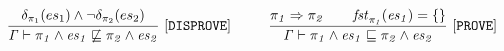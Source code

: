  \begin{gather*}
\frac{
\begin{matrix}
\text{\codeme{\delta_{\pi_1}(\es_1) \wedge \neg \delta_{\pi_2}(\es_2) }}
\end{matrix}
}{\text{\code{\Gamma  \vdash  \pi_1 \wedge \es_1 \not\CONTAIN  \pi_2 \wedge \es_2 }}}\ \codeme{  [DISPROVE]} 
\qquad\ \ 
\frac{
\begin{matrix}
\text{\code{\pi_1 \Rightarrow \pi_2 \quad\ \  
\m{fst}_{\pi_1}(\es_1) = \{\}
}}
\end{matrix}
}{\text{\code{\Gamma   \vdash  \pi_1 \wedge \es_1 \CONTAIN  \pi_2 \wedge \es_2 }}}\ \codeme{  [PROVE]} 
\end{gather*}